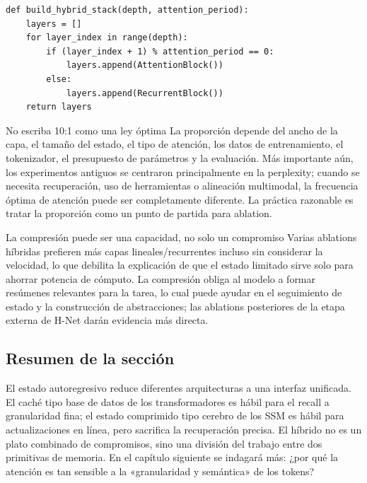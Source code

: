 \begin{lstlisting}[caption={Pseudocódigo didáctico de un pila híbrida con atención insertada periódicamente}]
def build_hybrid_stack(depth, attention_period):
    layers = []
    for layer_index in range(depth):
        if (layer_index + 1) % attention_period == 0:
            layers.append(AttentionBlock())
        else:
            layers.append(RecurrentBlock())
    return layers
\end{lstlisting}


\begin{warningbox}{No escriba 10:1 como una ley óptima}
La proporción depende del ancho de la capa, el tamaño del estado, el tipo de atención, los datos de entrenamiento, el tokenizador, el presupuesto de parámetros y la evaluación. Más importante aún, los experimentos antiguos se centraron principalmente en la perplexity; cuando se necesita recuperación, uso de herramientas o alineación multimodal, la frecuencia óptima de atención puede ser completamente diferente. La práctica razonable es tratar la proporción como un punto de partida para ablation.
\end{warningbox}

\begin{importantbox}{La compresión puede ser una capacidad, no solo un compromiso}
Varias ablations híbridas prefieren más capas lineales/recurrentes incluso sin considerar la velocidad, lo que debilita la explicación de que el estado limitado sirve solo para ahorrar potencia de cómputo. La compresión obliga al modelo a formar resúmenes relevantes para la tarea, lo cual puede ayudar en el seguimiento de estado y la construcción de abstracciones; las ablations posteriores de la etapa externa de H-Net darán evidencia más directa.
\end{importantbox}

\subsection{Resumen de la sección}

El estado autoregresivo reduce diferentes arquitecturas a una interfaz unificada. El caché tipo base de datos de los transformadores es hábil para el recall a granularidad fina; el estado comprimido tipo cerebro de los SSM es hábil para actualizaciones en línea, pero sacrifica la recuperación precisa. El híbrido no es un plato combinado de compromisos, sino una división del trabajo entre dos primitivas de memoria. En el capítulo siguiente se indagará más: ¿por qué la atención es tan sensible a la «granularidad y semántica» de los tokens?
